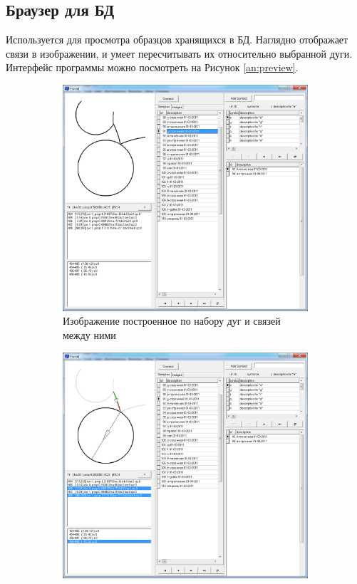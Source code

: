 \subsection{Браузер для БД}
Используется для просмотра образцов хранящихся в БД. 
Наглядно отображает связи в изображении, и умеет пересчитывать их относительно выбранной дуги. Интерфейс программы можно посмотреть на Рисунок \ref{an:preview}.
\begin{figure}[h]
	\begin{subfigure}{.5\textwidth}
		\centering
		\includegraphics[width=.9\linewidth]{images/an_preview_1}
		\caption{Изображение построенное по набору дуг и связей между ними}
	\end{subfigure}
	\begin{subfigure}{.5\textwidth}
		\centering
		\includegraphics[width=.9\linewidth]{images/an_preview_2}

\end{subfigure}
\end{figure}
